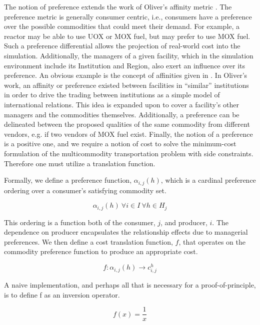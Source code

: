 The notion of preference extends the work of Oliver's affinity metric
\cite{oliver_geniusv2:_2009}. The preference metric is generally consumer
centric, i.e., consumers have a preference over the possible commodities that
could meet their demand. For example, a reactor may be able to use UOX or MOX
fuel, but may prefer to use MOX fuel. Such a preference differential allows the
projection of real-world cost into the simulation. Additionally, the managers of
a given facility, which in the \Cyclus simulation environment include its
Institution and Region, also exert an influence over its preference. An obvious
example is the concept of affinities given in \cite{oliver_geniusv2:_2009}. In
Oliver's work, an affinity or preference existed between facilities in
``similar'' institutions in order to drive the trading between institutions as a
simple model of international relations. This idea is expanded upon to cover a
facility's other managers and the commodities themselves. Additionally, a
preference can be delineated between the proposed qualities of the same
commodity from different vendors, e.g. if two vendors of MOX fuel
exist. Finally, the notion of a preference is a positive one, and we require a
notion of cost to solve the minimum-cost formulation of the multicommodity
transportation problem with side constraints. Therefore one must utilize a
translation function.

Formally, we define a preference function, $\alpha_{i,j}(h)$, which is a
cardinal preference ordering over a consumer's satisfying commodity set.

\begin{equation}
\alpha_{i,j}(h) \: \forall i \in I \: \forall h \in H_{j} 
\end{equation}

This ordering is a function both of the consumer, $j$, and producer, $i$. The
dependence on producer encapsulates the relationship effects due to managerial
preferences. We then define a cost translation function, $f$, that operates on
the commodity preference function to produce an appropriate cost.

\begin{equation}
f : \alpha_{i,j}(h) \to c_{i,j}^{h}
\end{equation}

A naive implementation, and perhaps all that is necessary for a
proof-of-principle, is to define f as an inversion operator.

\begin{equation}
f(x) = \frac{1}{x}
\end{equation}

